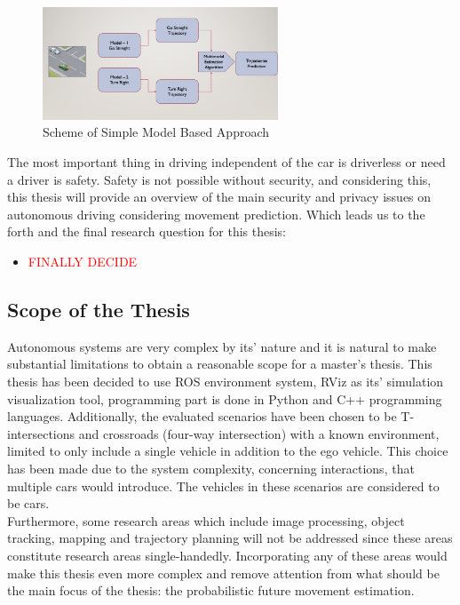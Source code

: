 \begin{figure}[h]
	\centering  	
	\includegraphics[width=7cm]{img/3.jpg}
	\caption{Scheme of Simple Model Based Approach \cite{pic2}}
	\label{fig:ModBasedApp}    
\end{figure}

The most important thing in driving independent of the car is driverless or need a driver is safety. Safety is not possible without security, and considering this, this thesis will provide an overview of the main security and privacy issues on autonomous driving considering movement prediction. Which leads us to the forth and the final research question for this thesis:
\begin{itemize}
	\item \textcolor{red}{FINALLY DECIDE} 
\end{itemize}

\subsection{Scope of the Thesis}

Autonomous systems are very complex by its' nature and it is natural to make substantial limitations to obtain a reasonable scope for a master’s thesis. This thesis has been decided to use \gls{ROS} environment system, RViz as its' simulation visualization tool, programming part is done in Python and C++ programming languages. Additionally, the evaluated scenarios have been chosen to be T-intersections and crossroads (four-way intersection) with a known environment, limited to only include a single vehicle in addition to the ego vehicle. This choice has been made due to the system complexity, concerning interactions, that multiple cars would introduce. The vehicles in these scenarios are considered to be cars. \\

Furthermore, some research areas which include image processing, object tracking, mapping and trajectory planning will not be addressed since these areas constitute research areas single-handedly. Incorporating any of these areas would make this thesis even more complex and remove attention from what should be the main focus of the thesis: the probabilistic future movement estimation.

